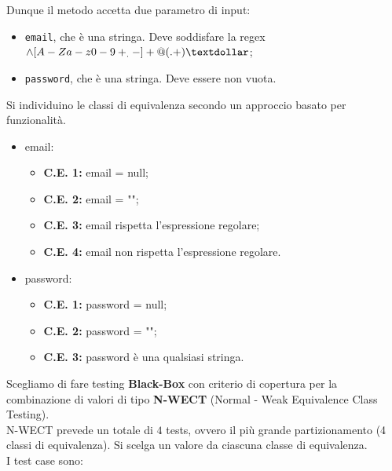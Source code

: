             \noindent Dunque il metodo accetta due parametro di input:
            \begin{itemize}
                \item \texttt{email}, che è una stringa. Deve soddisfare la regex $\wedge[A-Za-z0-9+_.-]+@(.+)\textdollar$;
                \item \texttt{password}, che è una stringa. Deve essere non vuota.
            \end{itemize}
            
            \noindent Si individuino le classi di equivalenza secondo un approccio basato per funzionalità.

            \begin{itemize}
                \item email:
                    \begin{itemize}
                        \item \textbf{C.E. 1:} email = null;
                        \item \textbf{C.E. 2:} email = "";
                        \item \textbf{C.E. 3:} email rispetta l'espressione regolare;
                        \item \textbf{C.E. 4:} email non rispetta l'espressione regolare.
                    \end{itemize}
                \item password:
                    \begin{itemize}
                        \item \textbf{C.E. 1:} password = null;
                        \item \textbf{C.E. 2:} password = "";
                        \item \textbf{C.E. 3:} password è una qualsiasi stringa.
                    \end{itemize}
            \end{itemize}

            \noindent Scegliamo di fare testing \textbf{Black-Box} con criterio di copertura per la combinazione di valori di tipo \textbf{N-WECT} (Normal - Weak Equivalence Class Testing).\\
            N-WECT prevede un totale di \(4\) tests, ovvero il più grande partizionamento (4 classi di equivalenza). Si scelga un valore da ciascuna classe di equivalenza.\\
            
            \noindent I test case sono:

